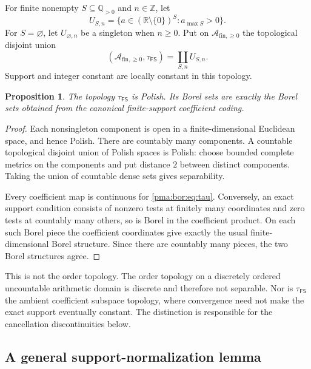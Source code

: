 \documentclass[11pt]{article}
\numberwithin{equation}{section}
\newtheorem{proposition}[proposition]{Proposition}
\theoremstyle{definition}
\theoremstyle{remark}
\newcommand{\Z}{\mathbb Z}
\newcommand{\Q}{\mathbb Q}
\newcommand{\R}{\mathbb R}
\newcommand{\FS}{\mathsf{FS}}
\newcommand{\PP}{\mathcal A_{\mathrm{fin},\geq 0}}
\begin{document}
For finite nonempty $S\subseteq\Q_{>0}$ and $n\in\Z$, let
\[
 U_{S,n}=\{a\in(\R\setminus\{0\})^S:a_{\max S}>0\}.
\]
For $S=\varnothing$, let $U_{\varnothing,n}$ be a singleton when $n\geq0$.
Put on $\PP$ the topological disjoint union
\begin{equation}
\label{pma:bor:eq:tau}
 (\PP,\tau_{\FS})=\coprod_{S,n}U_{S,n}.
\end{equation}
Support and integer constant are locally constant in this topology.

\begin{proposition}
\label{pma:bor:prop:Polish}
The topology $\tau_{\FS}$ is Polish. Its Borel sets are exactly the Borel
sets obtained from the canonical finite-support coefficient coding.
\end{proposition}
\begin{proof}
Each nonsingleton component is open in a finite-dimensional Euclidean space,
and hence Polish. There are countably many components. A countable topological
disjoint union of Polish spaces is Polish: choose bounded complete metrics
on the components and put distance $2$ between distinct components. Taking the
union of countable dense sets gives separability.

Every coefficient map is continuous for \eqref{pma:bor:eq:tau}. Conversely, an exact
support condition consists of nonzero tests at finitely many coordinates and
zero tests at countably many others, so is Borel in the coefficient product.
On each such Borel piece the coefficient coordinates give exactly the usual
finite-dimensional Borel structure. Since there are countably many pieces,
the two Borel structures agree.
\end{proof}

This is not the order topology. The order topology on a discretely ordered
uncountable arithmetic domain is discrete and therefore not separable. Nor is
$\tau_{\FS}$ the ambient coefficient subspace topology, where convergence
need not make the exact support eventually constant.
The distinction is responsible for the cancellation discontinuities below.

\subsection{A general support-normalization lemma}
\end{document}
